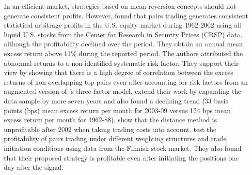\documentclass[a4paper,12pt]{report}
\begin{document}
\begin{refsection}
In an efficient market, strategies based on mean-reversion concepts should not generate consistent profits. However, \citet*{ggr06} found that pairs trading generates consistent statistical arbitrage profits in the U.S. equity market during 1962-2002 using all liquid U.S. stocks from the Center for Research in Security Prices (CRSP) data, although the profitability declined over the period. They obtain an annual mean excess return above 11\% during the reported period. The authors attributed the abnormal returns to a non-identified systematic risk factor. They support their view by showing that there is a high degree of correlation between the excess returns of non-overlapping top pairs even after accounting for risk factors from an augmented version of \citet*{ff93}'s three-factor model. \citet*{df10} extend their work by expanding the data sample by more seven years and also found a declining trend (33 basis points (bps) mean excess return per month for 2003-09 versus 124 bps mean excess return per month for 1962-88). \citet*{df12} show that the distance method is unprofitable after 2002 when taking trading costs into account. \citet*{bv12} test the profitability of pairs trading under different weighting structures and trade initiation conditions using data from the Finnish stock market. They also found that their proposed strategy is profitable even after initiating the positions one day after the signal.


\end{refsection}
\end{document}

